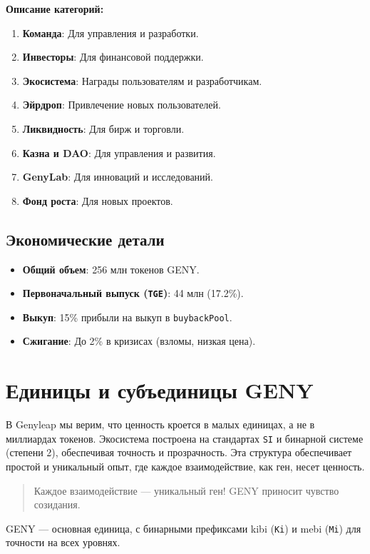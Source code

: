 \documentclass[a4paper,12pt,openany]{book}
\begin{document}
\textbf{Описание категорий:}
\begin{enumerate}
    \item \textbf{Команда}: Для управления и разработки.
    \item \textbf{Инвесторы}: Для финансовой поддержки.
    \item \textbf{Экосистема}: Награды пользователям и разработчикам.
    \item \textbf{Эйрдроп}: Привлечение новых пользователей.
    \item \textbf{Ликвидность}: Для бирж и торговли.
    \item \textbf{Казна и DAO}: Для управления и развития.
    \item \textbf{GenyLab}: Для инноваций и исследований.
    \item \textbf{Фонд роста}: Для новых проектов.
\end{enumerate}

\subsection*{Экономические детали}
\begin{itemize}
    \item \textbf{Общий объем}: 256 млн токенов GENY.
    \item \textbf{Первоначальный выпуск (\texttt{TGE})}: 44 млн (17.2\%).
    \item \textbf{Выкуп}: 15\% прибыли на выкуп в \texttt{buybackPool}.
    \item \textbf{Сжигание}: До 2\% в кризисах (взломы, низкая цена).
\end{itemize}
\newpage

\section*{Единицы и субъединицы GENY}
В Genyleap мы верим, что ценность кроется в малых единицах, а не в миллиардах токенов. Экосистема построена на стандартах \texttt{SI} и бинарной системе (степени 2), обеспечивая точность и прозрачность. Эта структура обеспечивает простой и уникальный опыт, где каждое взаимодействие, как ген, несет ценность.

\begin{quote}
Каждое взаимодействие — уникальный ген! GENY приносит чувство созидания.
\end{quote}
GENY — основная единица, с бинарными префиксами kibi (\texttt{Ki}) и mebi (\texttt{Mi}) для точности на всех уровнях.
\end{document}
